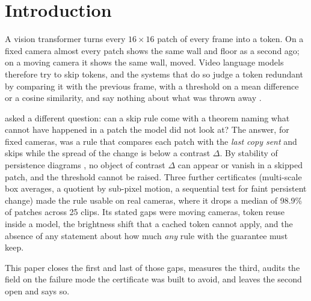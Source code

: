 \section{Introduction}

A vision transformer turns every $16 \times 16$ patch of every frame into a token. On a fixed camera almost every patch shows the same wall and floor as a second ago; on a moving camera it shows the same wall, moved. Video language models therefore try to skip tokens, and the systems that do so judge a token redundant by comparing it with the previous frame, with a threshold on a mean difference or a cosine similarity, and say nothing about what was thrown away \citep{choudhury2024rlt,tao2025dycoke,huang2025prunevid,fu2024framefusion,shen2024longvu,yao2025timechatonline}.

\citet{nair2026certifiedskip} asked a different question: can a skip rule come with a theorem naming what cannot have happened in a patch the model did not look at? The answer, for fixed cameras, was a rule that compares each patch with the \emph{last copy sent} and skips while the spread of the change is below a contrast $\Delta$. By stability of persistence diagrams \citep{cohensteiner2007}, no object of contrast $\Delta$ can appear or vanish in a skipped patch, and the threshold cannot be raised. Three further certificates (multi-scale box averages, a quotient by sub-pixel motion, a sequential test for faint persistent change) made the rule usable on real cameras, where it drops a median of 98.9\% of patches across 25 clips. Its stated gaps were moving cameras, token reuse inside a model, the brightness shift that a cached token cannot apply, and the absence of any statement about how much \emph{any} rule with the guarantee must keep.

This paper closes the first and last of those gaps, measures the third, audits the field on the failure mode the certificate was built to avoid, and leaves the second open and says so.

